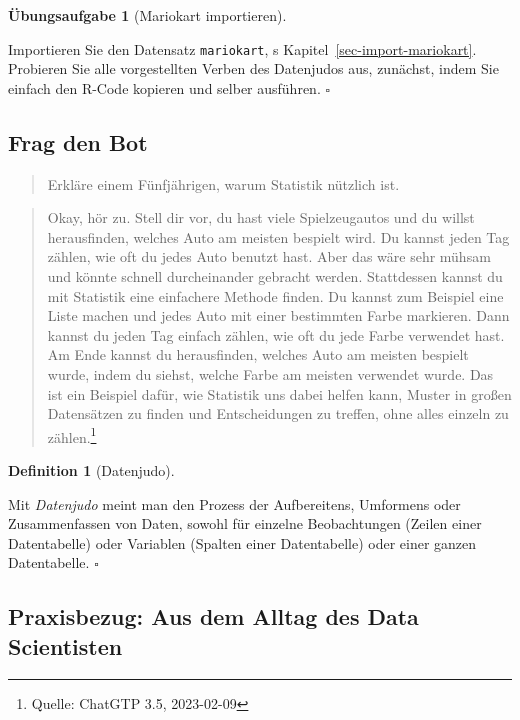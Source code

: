 \documentclass[
  letterpaper,
  twoside,
  open=any]{scrbook}
\theoremstyle{definition}
\newtheorem{definition}{Definition}[chapter]
\theoremstyle{definition}
\newtheorem{exercise}{Übungsaufgabe}[chapter]
\theoremstyle{definition}
\theoremstyle{remark}
\begin{document}
\begin{exercise}[Mariokart
importieren]\protect\hypertarget{exr-los}{}\label{exr-los}

Importieren Sie den Datensatz \texttt{mariokart}, s
Kapitel~\ref{sec-import-mariokart}. Probieren Sie alle vorgestellten
Verben des Datenjudos aus, zunächst, indem Sie einfach den R-Code
kopieren und selber ausführen. \(\square\)

\end{exercise}

\subsection{Frag den Bot}\label{frag-den-bot}

\begin{quote}
{} Erkläre einem Fünfjährigen, warum Statistik nützlich
ist.
\end{quote}

\begin{quote}
{} Okay, hör zu. Stell dir vor, du hast viele
Spielzeugautos und du willst herausfinden, welches Auto am meisten
bespielt wird. Du kannst jeden Tag zählen, wie oft du jedes Auto benutzt
hast. Aber das wäre sehr mühsam und könnte schnell durcheinander
gebracht werden. Stattdessen kannst du mit Statistik eine einfachere
Methode finden. Du kannst zum Beispiel eine Liste machen und jedes Auto
mit einer bestimmten Farbe markieren. Dann kannst du jeden Tag einfach
zählen, wie oft du jede Farbe verwendet hast. Am Ende kannst du
herausfinden, welches Auto am meisten bespielt wurde, indem du siehst,
welche Farbe am meisten verwendet wurde. Das ist ein Beispiel dafür, wie
Statistik uns dabei helfen kann, Muster in großen Datensätzen zu finden
und Entscheidungen zu treffen, ohne alles einzeln zu zählen.\footnote{Quelle:
  ChatGTP 3.5, 2023-02-09}
\end{quote}

\begin{definition}[Datenjudo]\protect\hypertarget{def-datenjudo}{}\label{def-datenjudo}

Mit \emph{Datenjudo} meint man den Prozess der Aufbereitens, Umformens
oder Zusammenfassen von Daten, sowohl für einzelne Beobachtungen (Zeilen
einer Datentabelle) oder Variablen (Spalten einer Datentabelle) oder
einer ganzen Datentabelle. \(\square\)

\end{definition}

\subsection{Praxisbezug: Aus dem Alltag des Data
Scientisten}\label{praxisbezug-aus-dem-alltag-des-data-scientisten}
\end{document}
